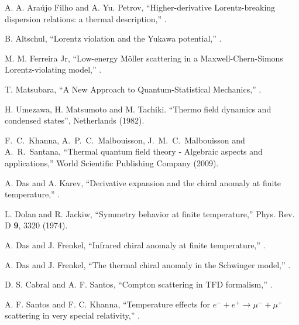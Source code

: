 \documentclass[11pt,showpacs,preprintnumbers,amsmath,amssymb,prd,nofootinbib,superscriptaddress]{revtex4-2}
\begin{document}
{\begin{thebibliography}{99}
 A. A. Ara\'{u}jo Filho and A. Yu. Petrov, ``Higher-derivative Lorentz-breaking dispersion relations: a thermal description,'' .

 B. Altschul, ``Lorentz violation and the Yukawa potential,'' .

 M. M. Ferreira Jr, ``Low-energy M\"oller scattering in a Maxwell-Chern-Simons Lorentz-violating model,'' .

 T. Matsubara, ``A New Approach to Quantum-Statistical Mechanics,'' .

 H. Umezawa, H. Matsumoto and M. Tachiki. ``Thermo field dynamics and condensed states'', Netherlands (1982).

  F.~C.~Khanna, A.~P.~C.~Malbouisson, J.~M.~C.~Malbouisson and A.~R.~Santana,
``Thermal quantum field theory - Algebraic aspects and applications,''
World Scientific Publishing Company (2009).

 A. Das and A. Karev, ``Derivative expansion and the chiral anomaly at finite temperature,'' .

 L. Dolan and R. Jackiw, ``Symmetry behavior at finite temperature,''  {{Phys. Rev. D} {\bf 9}, 3320 (1974)}.

 A. Das and J. Frenkel, ``Infrared chiral anomaly at finite temperature,'' .

 A. Das and J. Frenkel, ``The thermal chiral anomaly in the Schwinger model,'' .

 D. S. Cabral and A. F. Santos, ``Compton scattering in TFD formalism,'' .

 A. F. Santos and F. C. Khanna, ``Temperature effects for \( e^- + e^+ \rightarrow \mu^- + \mu^+ \) scattering in very special relativity,'' .


\end{thebibliography}}
\end{document}
